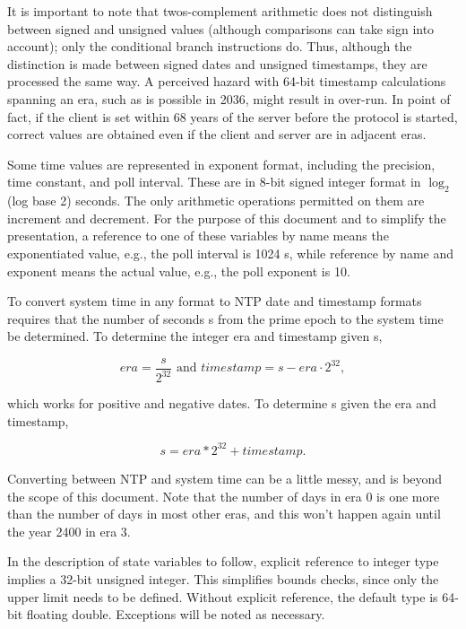It is important to note that twos-complement arithmetic does not
distinguish between signed and unsigned values (although comparisons
can take sign into account); only the conditional branch instructions
do. Thus, although the distinction is made between signed dates and
unsigned timestamps, they are processed the same way. A perceived
hazard with 64-bit timestamp calculations spanning an era, such as is
possible in 2036, might result in over-run. In point of fact, if the
client is set within 68 years of the server before the protocol is
started, correct values are obtained even if the client and server
are in adjacent eras.

Some time values are represented in exponent format, including the
precision, time constant, and poll interval. These are in 8-bit
signed integer format in $ \log_2 $ (log base 2) seconds. The only
arithmetic operations permitted on them are increment and decrement.
For the purpose of this document and to simplify the presentation, a
reference to one of these variables by name means the exponentiated
value, e.g., the poll interval is 1024 s, while reference by name and
exponent means the actual value, e.g., the poll exponent is 10.

To convert system time in any format to NTP date and timestamp
formats requires that the number of seconds s from the prime epoch to
the system time be determined. To determine the integer era and
timestamp given s,

$$
era = \frac{s}{2^{32}} \text{ and } timestamp = s - era \cdot 2^{32},
$$

which works for positive and negative dates. To determine s given
the era and timestamp,

$$
s = era * 2^{32} + timestamp.
$$

Converting between NTP and system time can be a little messy, and is
beyond the scope of this document. Note that the number of days in
era 0 is one more than the number of days in most other eras, and
this won't happen again until the year 2400 in era 3.

In the description of state variables to follow, explicit reference
to integer type implies a 32-bit unsigned integer. This simplifies
bounds checks, since only the upper limit needs to be defined.
Without explicit reference, the default type is 64-bit floating
double. Exceptions will be noted as necessary.
